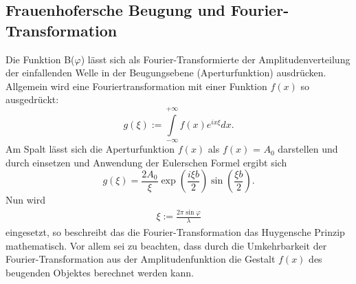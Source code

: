 \subsection{Frauenhofersche Beugung und Fourier-Transformation}
Die Funktion B($\varphi$) lässt sich als Fourier-Transformierte der Amplitudenverteilung der einfallenden Welle in der Beugungsebene
 (Aperturfunktion) ausdrücken. Allgemein wird  eine Fouriertransformation mit einer Funktion $f(x)$ so ausgedrückt:
 \begin{equation}
g(\xi) := \int\limits_{-\infty}^{+\infty}f(x)e^{ix\xi}dx.
\end{equation}
Am Spalt lässt sich die Aperturfunktion $f(x)$ als $f(x)$ = $A_0$ darstellen und durch einsetzen und Anwendung der Eulerschen Formel ergibt sich
\begin{equation}
g(\xi) = \frac{2A_0}{\xi}\exp\left(\frac{i\xi b}{2}\right)\sin\left(\frac{\xi b}{2}\right).
\end{equation}
Nun wird
\begin{align}
\xi := \frac{2\pi\sin\varphi}{\lambda}
\end{align}
eingesetzt, so beschreibt das die Fourier-Transformation das Huygensche Prinzip mathematisch. 
Vor allem sei zu beachten, dass durch die Umkehrbarkeit der Fourier-Transformation aus der Amplitudenfunktion
 die Gestalt $f(x)$ des beugenden Objektes berechnet werden kann.